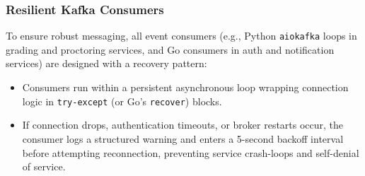 \subsubsection{Resilient Kafka Consumers}
To ensure robust messaging, all event consumers (e.g., Python \texttt{aiokafka} loops in grading and proctoring services, and Go consumers in auth and notification services) are designed with a recovery pattern:
\begin{itemize}
    \item Consumers run within a persistent asynchronous loop wrapping connection logic in \texttt{try-except} (or Go's \texttt{recover}) blocks.
    \item If connection drops, authentication timeouts, or broker restarts occur, the consumer logs a structured warning and enters a 5-second backoff interval before attempting reconnection, preventing service crash-loops and self-denial of service.
\end{itemize}
